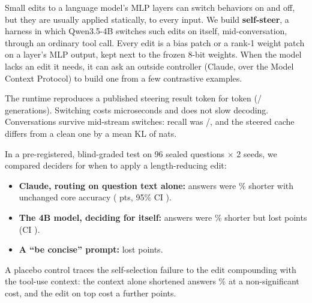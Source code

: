 Small edits to a language model's MLP layers can switch behaviors on and off, but they are usually applied statically, to every input. We build \textbf{self-steer}, a harness in which Qwen3.5-4B switches such edits on itself, mid-conversation, through an ordinary tool call. Every edit is a bias patch or a rank-1 weight patch on a layer's MLP output, kept next to the frozen 8-bit weights. When the model lacks an edit it needs, it can ask an outside controller (Claude, over the Model Context Protocol) to build one from a few contrastive examples.

The runtime reproduces a published steering result token for token (\FidelityIdentical/\FidelityCells{} generations). Switching costs microseconds and does not slow decoding. Conversations survive mid-stream switches: recall was \RecallLazyKeep/\CtxN, and the steered cache differs from a clean one by a mean KL of \KLLazyKeep{} nats.

In a pre-registered, blind-graded test on 96 sealed questions $\times$ 2 seeds, we compared deciders for when to apply a length-reducing edit:
\begin{itemize}
\item \textbf{Claude, routing on question text alone:} answers were \RoutedWords\% shorter with unchanged core accuracy (\RoutedCore{} pts, 95\% CI \RoutedCoreCI).
\item \textbf{The 4B model, deciding for itself:} answers were \SelfWords\% shorter but lost \SelfCoreAbs{} points (CI \SelfCoreCI).
\item \textbf{A ``be concise'' prompt:} lost \PromptCoreAbs{} points.
\end{itemize}
A placebo control traces the self-selection failure to the edit compounding with the tool-use context: the context alone shortened answers \PlaceboWords\% at a non-significant cost, and the edit on top cost a further \SelfMinusPlacebo{} points.

